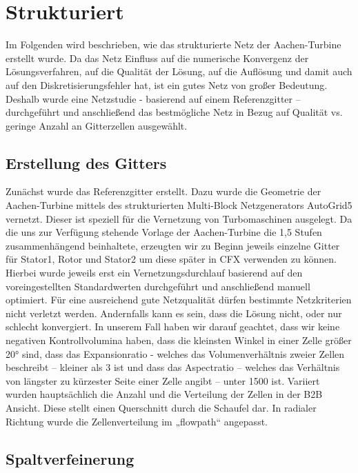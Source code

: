\section{Strukturiert}
Im Folgenden wird beschrieben, wie das strukturierte Netz der Aachen-Turbine erstellt wurde. Da das Netz Einfluss auf die numerische Konvergenz der Lösungsverfahren, auf die Qualität der Lösung, auf die Auflösung und damit auch auf den Diskretisierungsfehler hat, ist ein gutes Netz von großer Bedeutung. Deshalb wurde eine Netzstudie - basierend auf einem Referenzgitter – durchgeführt und anschließend das bestmögliche Netz in Bezug auf Qualität vs. geringe Anzahl an Gitterzellen ausgewählt. 

\subsection{Erstellung des Gitters}

Zunächst wurde das Referenzgitter erstellt. Dazu wurde die Geometrie der Aachen-Turbine mittels des strukturierten Multi-Block Netzgenerators AutoGrid5 vernetzt. Dieser ist speziell für die Vernetzung von Turbomaschinen ausgelegt. 
Da die uns zur Verfügung stehende Vorlage der Aachen-Turbine die 1,5 Stufen zusammenhängend beinhaltete, erzeugten wir zu Beginn jeweils einzelne Gitter für Stator1, Rotor und Stator2 um diese später in CFX verwenden zu können. Hierbei wurde jeweils erst ein Vernetzungsdurchlauf basierend auf den voreingestellten Standardwerten durchgeführt und anschließend manuell optimiert. Für eine ausreichend gute Netzqualität dürfen bestimmte Netzkriterien nicht verletzt werden. Andernfalls kann es sein, dass die Lösung nicht, oder nur schlecht konvergiert. In unserem Fall haben wir darauf geachtet, dass wir keine negativen Kontrollvolumina haben, dass die kleinsten Winkel in einer Zelle größer 20° sind, dass das Expansionratio - welches das Volumenverhältnis zweier Zellen beschreibt – kleiner als 3 ist und dass das Aspectratio – welches das Verhältnis von längster zu kürzester Seite einer Zelle angibt – unter 1500 ist. Variiert wurden hauptsächlich die Anzahl und die Verteilung der Zellen in der B2B Ansicht. Diese stellt einen Querschnitt durch die Schaufel dar. In radialer Richtung wurde die Zellenverteilung im „flowpath“ angepasst. 

\subsection{Spaltverfeinerung}


